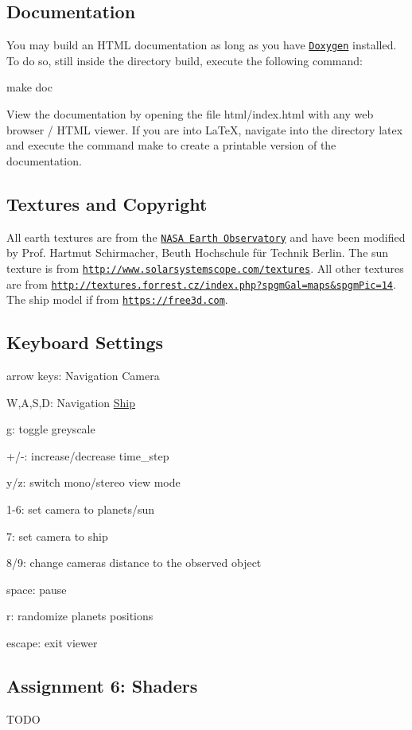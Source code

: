 \subsection*{Documentation }

You may build an H\+T\+ML documentation as long as you have \href{www.doxygen.org/}{\tt Doxygen} installed. To do so, still inside the directory {\ttfamily build}, execute the following command\+: \begin{DoxyVerb}make doc
\end{DoxyVerb}


View the documentation by opening the file {\ttfamily html/index.\+html} with any web browser / H\+T\+ML viewer. If you are into La\+TeX, navigate into the directory {\ttfamily latex} and execute the command {\ttfamily make} to create a printable version of the documentation.

\subsection*{Textures and Copyright }

All earth textures are from the \href{http://earthobservatory.nasa.gov/Features/BlueMarble/}{\tt N\+A\+SA Earth Observatory} and have been modified by Prof. Hartmut Schirmacher, Beuth Hochschule für Technik Berlin. The sun texture is from \href{http://www.solarsystemscope.com/textures}{\tt http\+://www.\+solarsystemscope.\+com/textures}. All other textures are from \href{http://textures.forrest.cz/index.php?spgmGal=maps&spgmPic=14}{\tt http\+://textures.\+forrest.\+cz/index.\+php?spgm\+Gal=maps\&spgm\+Pic=14}. The ship model if from \href{https://free3d.com}{\tt https\+://free3d.\+com}.

\subsection*{Keyboard Settings }


\begin{DoxyItemize}
\item arrow keys\+: Navigation Camera
\item W,A,S,D\+: Navigation \hyperlink{classShip}{Ship}
\item g\+: toggle greyscale
\item +/-\/\+: increase/decrease time\+\_\+step
\item y/z\+: switch mono/stereo view mode
\item 1-\/6\+: set camera to planets/sun
\item 7\+: set camera to ship
\item 8/9\+: change camera\textquotesingle{}s distance to the observed object
\item space\+: pause
\item r\+: randomize planets\textquotesingle{} positions
\item escape\+: exit viewer
\end{DoxyItemize}

\subsection*{Assignment 6\+: Shaders }

T\+O\+DO 
